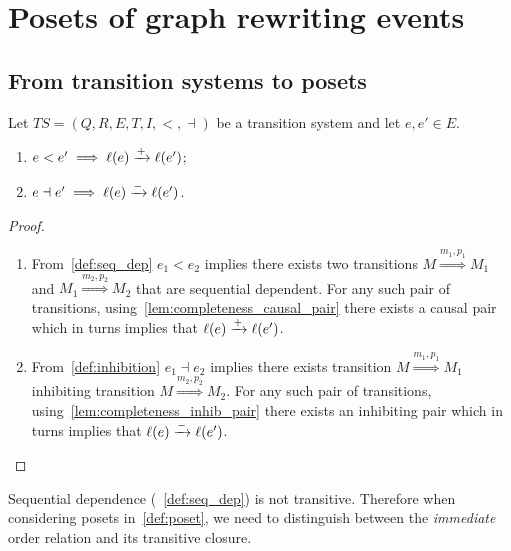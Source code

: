 \section{Posets of graph rewriting events}

\subsection{From transition systems to posets}

\begin{lemma}
  \label{lemma:pos_infl}
  Let $TS = (Q,R,E,T,I,<,\dashv)$ be a transition system and let $e,e' \in E$.
  \begin{enumerate}
  \item $e< e'\implies \ell(e)\xrightarrow{+}\ell(e')$;
  \item $e\dashv e' \implies\ell(e)\xrightarrow{-}\ell(e')$.
  \end{enumerate}
\end{lemma}
\begin{proof}
  \begin{enumerate}
  \item From~\autoref{def:seq_dep} $e_1 < e_2$ implies there exists two transitions $M\overset{m_1,p_1}{\Rightarrow} M_1$ and $M_1\overset{m_2,p_2}{\Rightarrow} M_2$ that are sequential dependent. For any such pair of transitions, using~\autoref{lem:completeness_causal_pair} there exists a causal pair which in turns implies that $\ell(e)\xrightarrow{+}\ell(e')$.

  \item From~\autoref{def:inhibition} $e_1 \dashv e_2$ implies there exists transition $M\overset{m_1,p_1}{\Rightarrow} M_1$ inhibiting transition $M\overset{m_2,p_2}{\Rightarrow} M_2$. For any such pair of transitions, using~\autoref{lem:completeness_inhib_pair} there exists an inhibiting pair which in turns implies that $\ell(e)\xrightarrow{-}\ell(e')$.
  \end{enumerate}
\end{proof}

\begin{remark}
  Sequential dependence (~\autoref{def:seq_dep}) is not transitive. Therefore when considering posets in~\autoref{def:poset}, we need to distinguish between the \emph{immediate} order relation and its transitive closure.
\end{remark}

